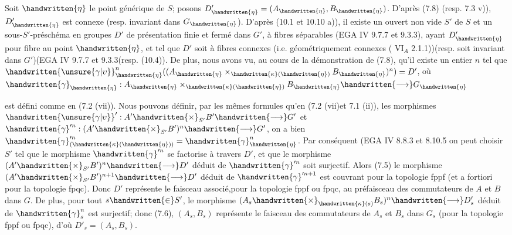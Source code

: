 Soit $\handwritten{\eta}$ le point générique de $S$; posons $D'_{\handwritten{\eta}}=(A_{\handwritten{\eta}},B_{\handwritten{\eta}})$. D'après (7.8) (resp. 7.3 v)), $D'_{\handwritten{\eta}}$ est connexe (resp. invariant dans $G_{\handwritten{\eta}}$). D'après (10.1 et 10.10 a)), il existe un ouvert non vide $S'$ de $S$ et un sous-$S'$-préschéma en groupes $D'$ de présentation finie et fermé dans $G'$, à fibres séparables (EGA IV 9.7.7 et 9.3.3), ayant $D'_{\handwritten{\eta}}$ pour fibre au point $\handwritten{\eta}$, et tel que $D'$ soit à fibres connexes (i.e. géométriquement connexes ( $\mathrm{VI}_A$ 2.1.1))(resp. soit invariant dans $G'$)(EGA IV 9.7.7 et 9.3.3\inserted{\handwritten{)}}(resp. (10.4)). De plus, nous avons vu, au cours de la démonstration de (7.8), qu'il existe un entier $n$ tel que $\handwritten{\unsure{\gamma|\upsilon}}_{\handwritten{\eta}}^n((A_{\handwritten{\eta}}\times_{\handwritten{\kappa}(\handwritten{\eta})}B_{\handwritten{\eta}})^n)=D'$, où $\handwritten{\gamma}_{\handwritten{\eta}}:A_{\handwritten{\eta}}\times_{\handwritten{\kappa}(\handwritten{\eta})}B_{\handwritten{\eta}}\handwritten{\longrightarrow}G_{\handwritten{\eta}}$

\par\noindent\handwritten{\rule{\linewidth}{0.3pt}}\par
{}\par
{}
est défini comme en (7.2 (vii)). Nous pouvons définir, par les mêmes formules qu'en (7.2 (vii)et 7.1 (ii)), les morphismes $\handwritten{\unsure{\gamma|\upsilon}}':A'\handwritten{\times}_{S'}B'\handwritten{\longrightarrow}G'$ et $\handwritten{\gamma}'^n:(A'\handwritten{\times}_{S'}B')^n\handwritten{\longrightarrow}G'$, on a bien $\handwritten{\gamma}'^n_{(\handwritten{\kappa}(\handwritten{\eta}))}=\handwritten{\gamma}^n_{\handwritten{\eta}}$. Par conséquent (EGA IV 8.8.3 et 8.10.5\deleted{)}\handwritten{,} on peut choisir $S'$ tel que le morphisme $\handwritten{\gamma}'^n$ se factorise à travers $D'$, et que le morphisme $(A'\handwritten{\times}_{S'}B')^n\handwritten{\longrightarrow}D'$ déduit de $\handwritten{\gamma}'^n$ soit surjectif. Alors (7.5) le morphisme $(A'\handwritten{\times}_{S'}B')^{n+1}\handwritten{\longrightarrow}D'$ déduit de $\handwritten{\gamma}'^{n+1}$ est couvrant pour la topologie fppf (et a fortiori pour la topologie fpqc). Donc $D'$ représente le faisceau associé,pour la topologie fppf ou fpqc, au préfaisceau des commutateurs de $A$ et $B$ dans $G$. De plus, pour tout $s\handwritten{\in}S'$, le morphisme $(A_s\handwritten{\times}_{\handwritten{\kappa}(s)}B_s)^n\handwritten{\longrightarrow}D'_s$ déduit de $\handwritten{\gamma}^n_s$ est surjectif; donc (7.6), $(A_s,B_s)$ représente le faisceau des commutateurs de $A_s$ et $B_s$ dans $G_s$ (pour la topologie fppf ou fpqc), d'où $D'_s=(A_s,B_s)$.

